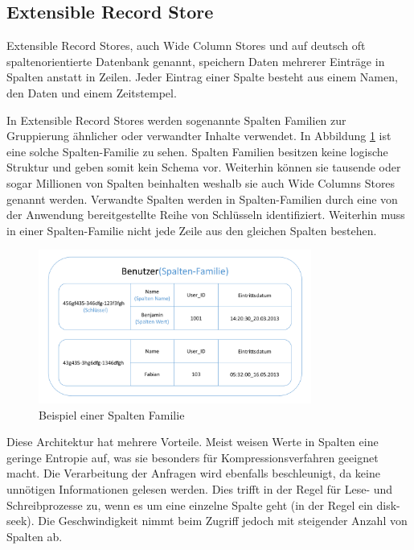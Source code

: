 \subsection{Extensible Record Store}
\label{ch:grundlagen:sec:NoSQL:ExtensibleRecordStore}

Extensible Record Stores, auch Wide Column Stores und auf deutsch oft spaltenorientierte Datenbank genannt, speichern Daten mehrerer Einträge in Spalten anstatt in Zeilen. Jeder Eintrag einer Spalte besteht aus einem Namen, den Daten und einem Zeitstempel.

In Extensible Record Stores werden sogenannte Spalten Familien zur Gruppierung ähnlicher oder verwandter Inhalte verwendet. In Abbildung \ref{wide_column_store} ist eine solche Spalten-Familie zu sehen. Spalten Familien besitzen keine logische Struktur und geben somit kein Schema vor. Weiterhin können sie tausende oder sogar Millionen von Spalten beinhalten weshalb sie auch Wide Columns Stores genannt werden. Verwandte Spalten werden in Spalten-Familien durch eine von der Anwendung bereitgestellte Reihe von Schlüsseln identifiziert. Weiterhin muss in einer Spalten-Familie nicht jede Zeile aus den gleichen Spalten bestehen.

\begin{figure}[H]
	\centering
  \includegraphics[width=0.8\textwidth, width=0.8\textwidth]{pics/wide_column_stores.pdf}
	\caption{Beispiel einer Spalten Familie}
	\label{wide_column_store}
\end{figure}

Diese Architektur hat mehrere Vorteile. Meist weisen Werte in Spalten eine geringe Entropie auf, was sie besonders für Kompressionsverfahren geeignet macht. Die Verarbeitung der Anfragen wird ebenfalls beschleunigt, da keine unnötigen Informationen gelesen werden. Dies trifft in der Regel für Lese- und Schreibprozesse zu, wenn es um eine einzelne Spalte geht (in der Regel ein disk-seek). Die Geschwindigkeit nimmt beim Zugriff jedoch mit steigender Anzahl von Spalten ab.

